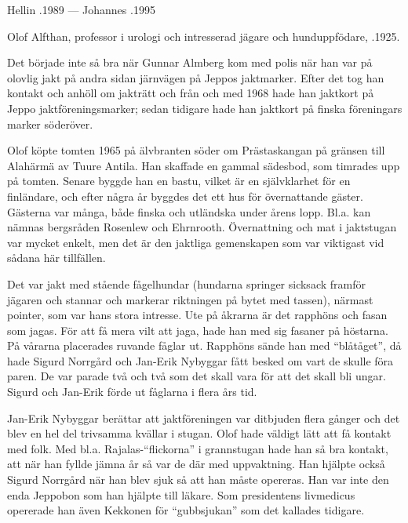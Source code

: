  Hellin .1989  ---  Johannes .1995






Olof Alfthan, professor i urologi och intresserad jägare och hunduppfödare, .1925.

Det började inte så bra när Gunnar Almberg kom med polis när han 	var på olovlig jakt på andra sidan järnvägen på Jeppos jaktmarker. Efter det tog han kontakt och anhöll om jakträtt och från och med 1968 hade han jaktkort på Jeppo jaktföreningsmarker; sedan tidigare hade han jaktkort på finska föreningars marker söderöver.

Olof köpte tomten 1965 på älvbranten söder om Prästaskangan på gränsen till Alahärmä av Tuure Antila. Han skaffade en gammal sädesbod, som timrades upp på tomten. Senare byggde han en bastu, vilket är en självklarhet för en finländare, och efter några år byggdes det ett hus för övernattande gäster. Gästerna var många, både finska och utländska under årens lopp. Bl.a. kan nämnas bergsråden Rosenlew och Ehrnrooth. Övernattning och mat i jaktstugan var mycket enkelt, men det är den jaktliga gemenskapen som var viktigast vid sådana	här tillfällen.

Det var jakt med stående fågelhundar (hundarna springer sicksack framför jägaren och stannar och markerar riktningen på bytet med tassen), närmast pointer, som var hans stora intresse. Ute på åkrarna är det rapphöns och fasan som jagas. För att få mera vilt att jaga, hade han med sig fasaner på höstarna. På vårarna placerades ruvande fåglar ut. Rapphöns sände han med ``blåtåget'', då hade Sigurd Norrgård och Jan-Erik Nybyggar fått besked om vart de skulle föra paren. De var parade två och två som det skall vara för att det skall bli ungar. Sigurd och Jan-Erik förde ut fåglarna i flera års tid.

Jan-Erik Nybyggar berättar att jaktföreningen var ditbjuden flera gånger och det blev en hel del trivsamma kvällar i stugan. Olof hade väldigt lätt att få kontakt med folk. Med bl.a. Rajalas-``flickorna'' i grannstugan hade han så bra kontakt, att när han fyllde jämna år så var de där med uppvaktning. Han hjälpte också Sigurd Norrgård när han blev sjuk så att han måste opereras. Han var inte den enda Jeppobon som han hjälpte till läkare. Som presidentens livmedicus 	opererade han även Kekkonen för ``gubbsjukan'' som det kallades	tidigare.


